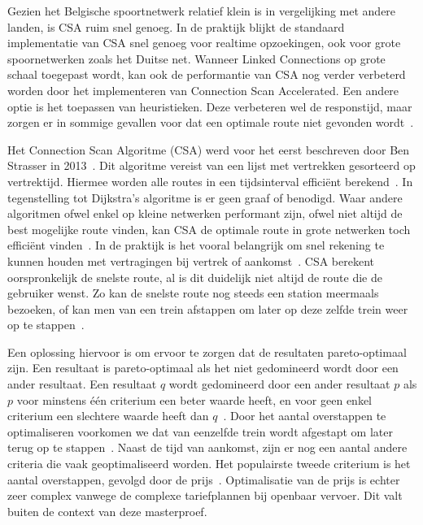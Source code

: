 Gezien het Belgische spoortnetwerk relatief klein is in vergelijking met andere landen, is CSA ruim snel genoeg. In de praktijk blijkt de standaard implementatie van CSA snel genoeg voor realtime opzoekingen, ook voor grote spoornetwerken zoals het Duitse net\citep{strasser14}. Wanneer Linked Connections op grote schaal toegepast wordt, kan ook de performantie van CSA nog verder verbeterd worden door het implementeren van Connection Scan Accelerated\citep{strasser14,strasser17}. Een andere optie is het toepassen van heuristieken. Deze verbeteren wel de responstijd, maar zorgen er in sommige gevallen voor dat een optimale route niet gevonden wordt~\citep{hannemann07}. 

Het Connection Scan Algoritme (CSA) werd voor het eerst beschreven door Ben Strasser in 2013~\citep{strasser13}. Dit algoritme vereist van een lijst met vertrekken gesorteerd op vertrektijd. Hiermee worden alle routes in een tijdsinterval efficiënt berekend~\citep{strasser14,strasser17}. In tegenstelling tot Dijkstra's algoritme is er geen graaf of  benodigd. Waar andere algoritmen ofwel enkel op kleine netwerken performant zijn, ofwel niet altijd de  best mogelijke route vinden, kan CSA de optimale route in grote netwerken toch efficiënt vinden~\citep{strasser14}. In de praktijk is het vooral belangrijk om snel rekening te kunnen houden met vertragingen bij vertrek of aankomst~\citep{strasser14,strasser17}. CSA berekent oorspronkelijk de snelste route, al is dit duidelijk niet altijd de route die de gebruiker wenst. Zo kan de snelste route nog steeds een station meermaals bezoeken, of kan men van een trein afstappen om later op deze zelfde trein weer op te stappen~\citep{strasser14}. 

Een oplossing hiervoor is om ervoor te zorgen dat de resultaten pareto-optimaal zijn. Een resultaat is pareto-optimaal als het niet gedomineerd wordt door een ander resultaat. Een resultaat $q$ wordt gedomineerd door een ander resultaat $p$ als $p$ voor minstens één criterium een beter waarde heeft, en voor geen enkel criterium een slechtere waarde heeft dan $q$~\citep{hannemann08,strasser17}. Door het aantal overstappen te optimaliseren voorkomen we dat van eenzelfde trein wordt afgestapt om later terug op te stappen~\citep{strasser14}. Naast de tijd van aankomst, zijn er nog een aantal andere criteria die vaak geoptimaliseerd worden. Het populairste tweede criterium is het aantal overstappen, gevolgd door de prijs~\citep{strasser17}. Optimalisatie van de prijs is echter zeer complex vanwege de complexe tariefplannen bij openbaar vervoer\citep{muller06}. Dit valt buiten de context van deze masterproef.

